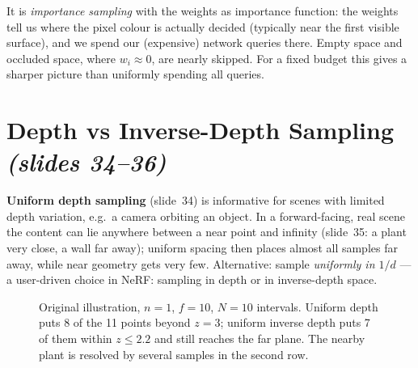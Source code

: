 \documentclass[11pt,a4paper]{article}
\newcommand{\sref}[1]{\texorpdfstring{\emph{(slides #1)}}{(slides #1)}}
\newcommand{\z}{\bm{z}}
\theoremstyle{definition}
\theoremstyle{plain}
\theoremstyle{remark}
\begin{document}
\begin{intuition}
It is \emph{importance sampling} with the weights as importance function: the weights tell us where the pixel colour is actually decided (typically near the first visible surface), and we spend our (expensive) network queries there. Empty space and occluded space, where $w_i\approx0$, are nearly skipped. For a fixed budget this gives a sharper picture than uniformly spending all queries.
\end{intuition}

\section{Depth vs Inverse-Depth Sampling \sref{34--36}}

\textbf{Uniform depth sampling} (slide~34) is informative for scenes with limited depth variation, e.g.\ a camera orbiting an object. In a forward-facing, real scene the content can lie anywhere between a near point and infinity (slide~35: a plant very close, a wall far away); uniform spacing then places almost all samples far away, while near geometry gets very few. Alternative: sample \emph{uniformly in $1/d$} --- a user-driven choice in NeRF: sampling in depth or in inverse-depth space.

\begin{figure}[H]
\centering
{}
\caption{Original illustration, $n=1$, $f=10$, $N=10$ intervals. Uniform depth puts 8 of the 11 points beyond $z=3$; uniform inverse depth puts 7 of them within $z\le2.2$ and still reaches the far plane. The nearby plant is resolved by several samples in the second row.}
\end{figure}
\end{document}
